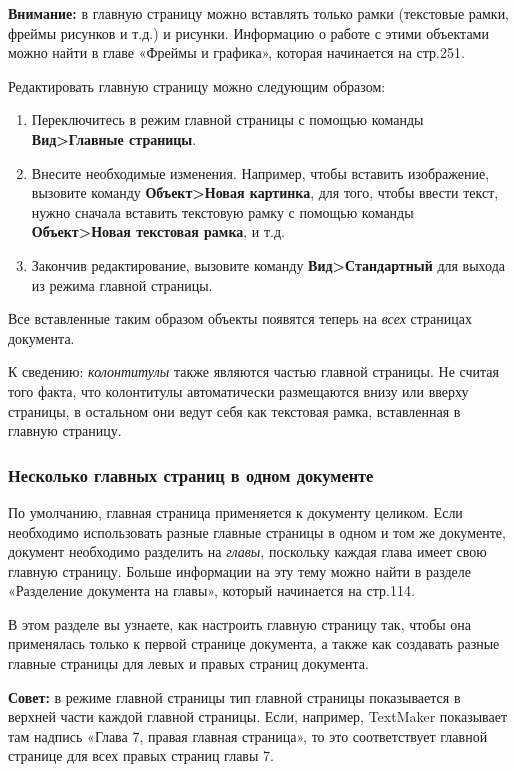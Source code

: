 \documentclass[a4paper,10pt]{article}
\begin{document}
\begin{mdframed}[backgroundcolor=blue!10]
\textbf{Внимание:} в главную страницу можно вставлять только рамки (текстовые рамки, фреймы рисунков и т.д.) и рисунки. Информацию о работе с этими объектами можно найти в главе «Фреймы и графика», которая начинается на стр.251.
\end{mdframed}

Редактировать главную страницу можно следующим образом:
\begin{enumerate}
 \item Переключитесь в режим главной страницы с помощью команды \textbf{Вид>Главные страницы}.
 \item Внесите необходимые изменения. Например, чтобы вставить изображение, вызовите команду \textbf{Объект>Новая картинка}, для того, чтобы ввести текст, нужно сначала вставить текстовую рамку с помощью команды \textbf{Объект>Новая текстовая рамка}, и т.д.
 \item Закончив редактирование, вызовите команду \textbf{Вид>Стандартный} для выхода из режима главной страницы.
\end{enumerate}

Все вставленные таким образом объекты появятся теперь на \textit{всех} страницах документа.

К сведению: \textit{колонтитулы} также являются частью главной страницы. Не считая того факта, что колонтитулы автоматически размещаются внизу или вверху страницы, в остальном они ведут себя как текстовая рамка, вставленная в главную страницу.

\subsubsection{Несколько главных страниц в одном документе}
По умолчанию, главная страница применяется к документу целиком. Если необходимо использовать разные главные страницы в одном и том же документе, документ необходимо разделить на \textit{главы}, поскольку каждая глава имеет свою главную страницу. Больше информации на эту тему можно найти в разделе «Разделение документа на главы», который начинается на стр.114.

В этом разделе вы узнаете, как настроить главную страницу так, чтобы она применялась только к первой странице документа, а также как создавать разные главные страницы для левых и правых страниц документа.

\begin{mdframed}[backgroundcolor=blue!10]
\textbf{Совет:} в режиме главной страницы тип главной страницы показывается в верхней части каждой главной страницы. Если, например, TextMaker показывает там надпись «Глава 7, правая главная страница», то это соответствует главной странице для всех правых страниц главы 7.
\end{mdframed}
\end{document}

